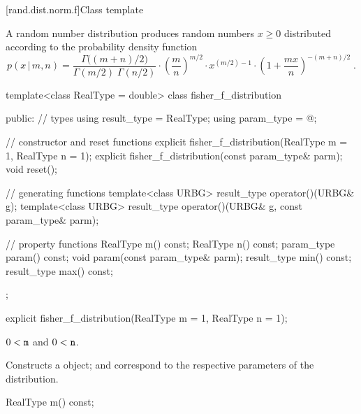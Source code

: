 [rand.dist.norm.f]{Class template }%
%
%

\pnum
A  random number distribution
produces random numbers $x\ge0$
distributed according to
the probability density function%
%
%
\[%
 p(x\,|\,m,n)
      = \frac{\Gamma\big((m+n)/2\big)}
             {\Gamma(m/2) \; \Gamma(n/2)}
        \cdot
        \left(\frac{m}{n}\right)^{m/2}
        \cdot
        x^{(m/2)-1}
        \cdot
        {\left( 1 + \frac{m x}{n}  \right)}^{-(m+n)/2}
\; \mbox{.}
\]

%
\begin{codeblock}
template<class RealType = double>
 class fisher_f_distribution
{
public:
 // types
 using result_type = RealType;
 using param_type  = @\unspec@;

 // constructor and reset functions
 explicit fisher_f_distribution(RealType m = 1, RealType n = 1);
 explicit fisher_f_distribution(const param_type& parm);
 void reset();

 // generating functions
 template<class URBG>
   result_type operator()(URBG& g);
 template<class URBG>
   result_type operator()(URBG& g, const param_type& parm);

 // property functions
 RealType m() const;
 RealType n() const;
 param_type param() const;
 void param(const param_type& parm);
 result_type min() const;
 result_type max() const;
};
\end{codeblock}


%
\begin{itemdecl}
explicit fisher_f_distribution(RealType m = 1, RealType n = 1);
\end{itemdecl}

\begin{itemdescr}
\pnum\requires
 $ 0 < \texttt{m} $ and $ 0 < \texttt{n} $.

\pnum\effects Constructs a  object;
  and 
 correspond to the respective parameters of the distribution.
\end{itemdescr}

%
\begin{itemdecl}
RealType m() const;
\end{itemdecl}

